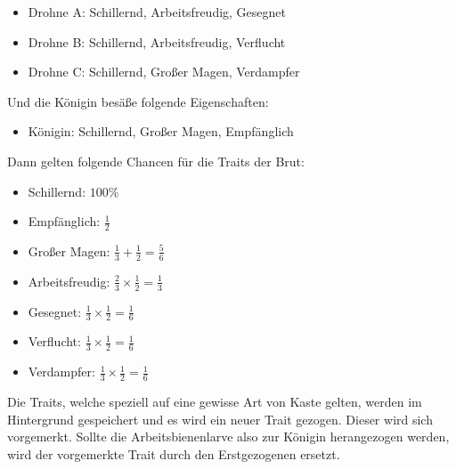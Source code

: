 \begin{itemize}
    \item Drohne A: Schillernd, Arbeitsfreudig, Gesegnet
    \item Drohne B: Schillernd, Arbeitsfreudig, Verflucht
    \item Drohne C: Schillernd, Großer Magen, Verdampfer
\end{itemize} Und die Königin besäße folgende Eigenschaften:

\begin{itemize}
    \item Königin: Schillernd, Großer Magen, Empfänglich
\end{itemize} Dann gelten folgende Chancen für die Traits der Brut:

\begin{itemize}
    \item Schillernd: $100\%$
    \item Empfänglich: $\frac{1}{2}$
    \item Großer Magen: $\frac{1}{3} + \frac{1}{2} = \frac{5}{6}$
    \item Arbeitsfreudig: $\frac{2}{3} \times \frac{1}{2} = \frac{1}{3}$
    \item Gesegnet: $\frac{1}{3} \times \frac{1}{2} = \frac{1}{6}$
    \item Verflucht: $\frac{1}{3} \times \frac{1}{2} = \frac{1}{6}$
    \item Verdampfer: $\frac{1}{3} \times \frac{1}{2} = \frac{1}{6}$
\end{itemize} Die Traits, welche speziell auf eine gewisse Art von Kaste gelten, werden im Hintergrund gespeichert und es wird ein neuer Trait gezogen. Dieser wird sich vorgemerkt. Sollte die Arbeitsbienenlarve also zur Königin herangezogen werden, wird der vorgemerkte Trait durch den Erstgezogenen ersetzt.

